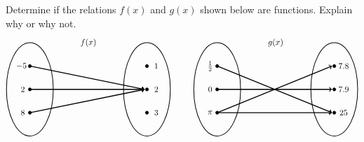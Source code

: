 \documentclass[11pt,letterpaper]{article}
\begin{document}

 Determine if the relations $f(x)$ and $g(x)$ shown below are functions. Explain why or why not. 
	\[
	\begin{tikzpicture}
	\node at (2.5,2) {$f(x)$};
	\draw[line width=0.03cm] (0,0) circle (1 and 2);
	\draw[line width=0.03cm] (5,0) circle (1 and 2);
	
	\draw[fill=black] (0,1) circle (0.07);
	\draw[fill=black] (0,0) circle (0.07);
	\draw[fill=black] (0,-1) circle (0.07);
	
	\draw[fill=black] (5,1) circle (0.07);
	\draw[fill=black] (5,0) circle (0.07);
	\draw[fill=black] (5,-1) circle (0.07);
	
	\draw[line width=0.04cm,->] (0,1) -- (4.9,0);
	\draw[line width=0.04cm,->] (0,0) -- (4.9,0);
	\draw[line width=0.04cm,->] (0,-1) -- (4.9,0);
	
	\node at (-0.3,1) {$\!\!-5$};
	\node at (-0.3,0) {$2$};
	\node at (-0.3,-1) {$8$};
	
	\node at (5.4,1) {$1$};
	\node at (5.4,0) {$2$};
	\node at (5.4,-1) {$3$};
	
	\tikzset{shift={(8,0)}}
	\node at (2.5,2) {$g(x)$};
	\draw[line width=0.03cm] (0,0) circle (1 and 2);
	\draw[line width=0.03cm] (5,0) circle (1 and 2);
	
	\draw[fill=black] (0,1) circle (0.07);
	\draw[fill=black] (0,0) circle (0.07);
	\draw[fill=black] (0,-1) circle (0.07);
	
	\draw[fill=black] (5,1) circle (0.07);
	\draw[fill=black] (5,0) circle (0.07);
	\draw[fill=black] (5,-1) circle (0.07);
	
	\draw[line width=0.04cm,->] (0,1) -- (4.9,-1);
	\draw[line width=0.04cm,->] (0,0) -- (4.9,0);
	\draw[line width=0.04cm,->] (0,-1) -- (4.9,1);
	\draw[line width=0.04cm,->] (0,-1) -- (4.9,-1);
	
	\node at (-0.3,1) {$\frac{1}{2}$};
	\node at (-0.3,0) {$0$};
	\node at (-0.3,-1) {$\pi$};
	
	\node at (5.4,1) {$7.8$};
	\node at (5.4,0) {$7.9$};
	\node at (5.4,-1) {$25$};
	\end{tikzpicture}
	\] \pspace



\newpage
\end{document}
